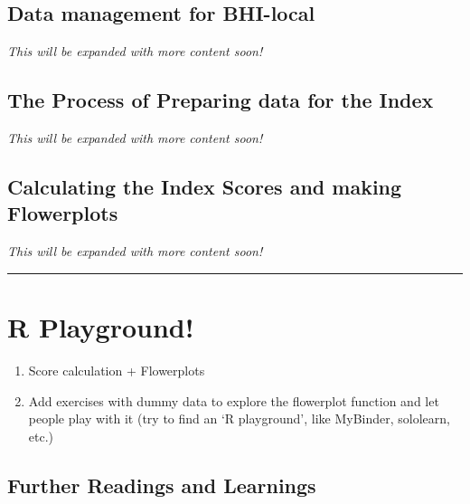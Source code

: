 \documentclass[
]{book}
\providecommand{\tightlist}{%
  \setlength{\itemsep}{0pt}\setlength{\parskip}{0pt}}
\begin{document}
\hypertarget{data-management-for-bhi-local}{%
\section{Data management for BHI-local}\label{data-management-for-bhi-local}}

\emph{This will be expanded with more content soon!}

\hypertarget{the-process-of-preparing-data-for-the-index}{%
\section{The Process of Preparing data for the Index}\label{the-process-of-preparing-data-for-the-index}}

\emph{This will be expanded with more content soon!}

\hypertarget{calculating-the-index-scores-and-making-flowerplots}{%
\section{Calculating the Index Scores and making Flowerplots}\label{calculating-the-index-scores-and-making-flowerplots}}

\emph{This will be expanded with more content soon!}

\begin{center}\rule{0.5\linewidth}{0.5pt}\end{center}

\hypertarget{r-playground}{%
\chapter{R Playground!}\label{r-playground}}

\begin{enumerate}
\def\labelenumi{\arabic{enumi})}
\tightlist
\item
  Score calculation + Flowerplots
\item
  Add exercises with dummy data to explore the flowerplot function and let people play with it (try to find an `R playground', like MyBinder, sololearn, etc.)
\end{enumerate}

\hypertarget{further-readings-and-learnings}{%
\section*{Further Readings and Learnings}\label{further-readings-and-learnings}}
\end{document}
